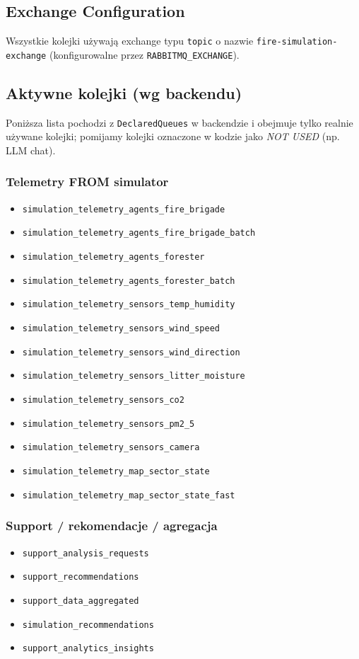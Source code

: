\subsection{Exchange Configuration}

Wszystkie kolejki używają exchange typu \texttt{topic} o nazwie \texttt{fire-simulation-exchange} (konfigurowalne przez \texttt{RABBITMQ\_EXCHANGE}).

\subsection{Aktywne kolejki (wg backendu)}

Poniższa lista pochodzi z \texttt{DeclaredQueues} w backendzie i obejmuje tylko realnie używane kolejki; pomijamy kolejki oznaczone w kodzie jako \textit{NOT USED} (np. LLM chat).

\subsubsection{Telemetry FROM simulator}
\begin{itemize}
  \item \texttt{simulation\_telemetry\_agents\_fire\_brigade}
  \item \texttt{simulation\_telemetry\_agents\_fire\_brigade\_batch}
  \item \texttt{simulation\_telemetry\_agents\_forester}
  \item \texttt{simulation\_telemetry\_agents\_forester\_batch}
  \item \texttt{simulation\_telemetry\_sensors\_temp\_humidity}
  \item \texttt{simulation\_telemetry\_sensors\_wind\_speed}
  \item \texttt{simulation\_telemetry\_sensors\_wind\_direction}
  \item \texttt{simulation\_telemetry\_sensors\_litter\_moisture}
  \item \texttt{simulation\_telemetry\_sensors\_co2}
  \item \texttt{simulation\_telemetry\_sensors\_pm2\_5}
  \item \texttt{simulation\_telemetry\_sensors\_camera}
  \item \texttt{simulation\_telemetry\_map\_sector\_state}
  \item \texttt{simulation\_telemetry\_map\_sector\_state\_fast}
\end{itemize}

\subsubsection{Support / rekomendacje / agregacja}
\begin{itemize}
  \item \texttt{support\_analysis\_requests}
  \item \texttt{support\_recommendations}
  \item \texttt{support\_data\_aggregated}
  \item \texttt{simulation\_recommendations}
  \item \texttt{support\_analytics\_insights}
\end{itemize}

